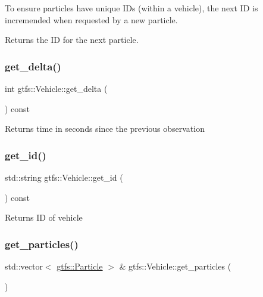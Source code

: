 To ensure particles have unique ID\textquotesingle{}s (within a vehicle), the next ID is incremended when requested by a new particle.

\begin{DoxyReturn}{Returns}
the ID for the next particle. 
\end{DoxyReturn}
\mbox{\label{classgtfs_1_1Vehicle_a23c0a191559e4066423d5f3cbfb70b46}} 
\subsubsection{\texorpdfstring{get\+\_\+delta()}{get\_delta()}}
{\footnotesize\ttfamily int gtfs\+::\+Vehicle\+::get\+\_\+delta (\begin{DoxyParamCaption}{ }\end{DoxyParamCaption}) const}

\begin{DoxyReturn}{Returns}
time in seconds since the previous observation 
\end{DoxyReturn}
\mbox{\label{classgtfs_1_1Vehicle_a6b388986c9ed4af1eb86f13a3d2de8e0}} 
\subsubsection{\texorpdfstring{get\+\_\+id()}{get\_id()}}
{\footnotesize\ttfamily std\+::string gtfs\+::\+Vehicle\+::get\+\_\+id (\begin{DoxyParamCaption}{ }\end{DoxyParamCaption}) const}

\begin{DoxyReturn}{Returns}
ID of vehicle 
\end{DoxyReturn}
\mbox{\label{classgtfs_1_1Vehicle_a7b12b079c68880f00f532ca25858c368}} 
\subsubsection{\texorpdfstring{get\+\_\+particles()}{get\_particles()}}
{\footnotesize\ttfamily std\+::vector$<$ \hyperlink{classgtfs_1_1Particle}{gtfs\+::\+Particle} $>$ \& gtfs\+::\+Vehicle\+::get\+\_\+particles (\begin{DoxyParamCaption}{ }\end{DoxyParamCaption})}

